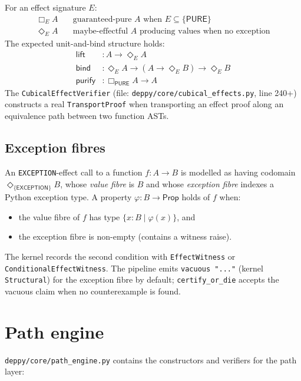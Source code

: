 For an effect signature $E$:
\begin{align*}
  \Box_E A   &\quad\text{guaranteed-pure $A$ when $E \subseteq \{\mathsf{PURE}\}$}\\
  \Diamond_E A &\quad\text{maybe-effectful $A$ producing values when no exception}
\end{align*}
The expected unit-and-bind structure holds:
\begin{align*}
  \mathsf{lift}     &: A \to \Diamond_E A\\
  \mathsf{bind}     &: \Diamond_E A \to (A \to \Diamond_E B) \to \Diamond_E B\\
  \mathsf{purify}   &: \Box_\mathsf{PURE} A \to A
\end{align*}
The \texttt{CubicalEffectVerifier} (file:
\texttt{deppy/core/cubical\_effects.py}, line 240+) constructs a
real \texttt{TransportProof} when transporting an effect proof
along an equivalence path between two function ASTs.

\subsection{Exception fibres}

An \texttt{EXCEPTION}-effect call to a function $f : A \to B$ is
modelled as having codomain $\Diamond_{\{\mathsf{EXCEPTION}\}} B$,
whose \emph{value fibre} is $B$ and whose \emph{exception fibre}
indexes a Python exception type.  A property
$\varphi : B \to \mathsf{Prop}$ holds of $f$ when:
\begin{itemize}[leftmargin=1.7em]
  \item the value fibre of $f$ has type $\{x : B \mid \varphi(x)\}$, and
  \item the exception fibre is non-empty (contains a witness raise).
\end{itemize}
The kernel records the second condition with \texttt{EffectWitness}
or \texttt{ConditionalEffectWitness}.  The pipeline emits
\texttt{vacuous "..."} (kernel \texttt{Structural}) for the
exception fibre by default; \texttt{certify\_or\_die} accepts the
vacuous claim when no counterexample is found.

\section{Path engine}
\label{sec:path-engine}

\texttt{deppy/core/path\_engine.py} contains the constructors and
verifiers for the path layer:

